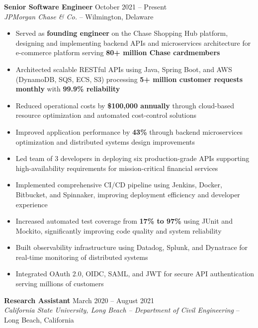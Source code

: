 \documentclass[11pt]{article}
\begin{document}
\textbf{Senior Software Engineer} \hfill October 2021 -- Present\\
\textit{JPMorgan Chase \& Co.} -- Wilmington, Delaware

\begin{itemize}
    \item Served as \textbf{founding engineer} on the Chase Shopping Hub platform, designing and implementing backend APIs and microservices architecture for e-commerce platform serving \textbf{80+ million Chase cardmembers}
    \item Architected scalable RESTful APIs using Java, Spring Boot, and AWS (DynamoDB, SQS, ECS, S3) processing \textbf{5+ million customer requests monthly} with \textbf{99.9\% reliability}
    \item Reduced operational costs by \textbf{\$100,000 annually} through cloud-based resource optimization and automated cost-control solutions
    \item Improved application performance by \textbf{43\%} through backend microservices optimization and distributed systems design improvements
    \item Led team of 3 developers in deploying six production-grade APIs supporting high-availability requirements for mission-critical financial services
    \item Implemented comprehensive CI/CD pipeline using Jenkins, Docker, Bitbucket, and Spinnaker, improving deployment efficiency and developer experience
    \item Increased automated test coverage from \textbf{17\% to 97\%} using JUnit and Mockito, significantly improving code quality and system reliability
    \item Built observability infrastructure using Datadog, Splunk, and Dynatrace for real-time monitoring of distributed systems
    \item Integrated OAuth 2.0, OIDC, SAML, and JWT for secure API authentication serving millions of customers
\end{itemize}

\textbf{Research Assistant} \hfill March 2020 -- August 2021\\
\textit{California State University, Long Beach -- Department of Civil Engineering} -- Long Beach, California
\end{document}
